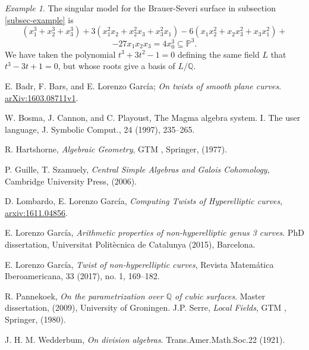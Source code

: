\documentclass[a4paper,10pt]{amsart}
\theoremstyle{plain}
\theoremstyle{definition}
\theoremstyle{remark}
\newtheorem{example}[theorem]{Example}
\numberwithin{equation}{section}
\begin{document}
\begin{example}The singular model for the Brauer-Severi surface in subsection \ref{subsec-example} is
	\small
	$$
	(x_1^3+x_2^3+x_3^3)+3(x_1^2x_2+x_2^2x_3+x_3^2x_1)-6(x_1x_2^2+x_2x_3^2+x_3x_1^2)+$$
	$$-27x_1x_2x_3=4x_{0}^3\subseteq\mathbb{P}^3.
	$$
	\normalsize
	We have taken the polynomial $t^3+3t^2-1=0$ defining the same field $L$ that $t^3-3t+1=0$, but whose roots give a basis of $L/\mathbb{Q}$.
\end{example}

\begin{thebibliography}{10}
	
	E. Badr, F. Bars, and E. Lorenzo Garc\'ia; \emph{On twists of smooth plane curves}. \href{https://arxiv.org/abs/1603.08711}{arXiv:1603.08711v1}.
	

	 W. Bosma, J. Cannon, and C. Playoust, The Magma algebra system. I. The user language, J. Symbolic Comput., 24 (1997), 235--265.
	

	 R. Hartshorne, \emph{Algebraic Geometry}, GTM , Springer, (1977).

	 P. Guille, T. Szamuely, \emph{Central Simple Algebras and
		Galois Cohomology}, Cambridge University Press, (2006).
	
	
	 D. Lombardo, E. Lorenzo Garc\'ia, \emph{Computing Twists of Hyperelliptic curves}, \href{https://arxiv.org/abs/1611.04856}{arxiv:1611.04856}.
	
	 E. Lorenzo Garc\'ia, \emph{Arithmetic properties of non-hyperelliptic genus 3
		curves}. PhD dissertation, Universitat Polit\`ecnica de Catalunya
	(2015), Barcelona.
	
	 E. Lorenzo Garc\'ia, \emph{Twist of non-hyperelliptic curves},
	Revista Matem\'atica Iberoamericana, 33 (2017), no. 1, 169--182. 

	 R. Pannekoek, \emph{On the parametrization over $\mathbb{Q}$
		of cubic surfaces}. Master dissertation, (2009), University of
	Groningen.
	 J.P. Serre, \emph{Local Fields}, GTM , Springer, (1980).
	 
	 J. H. M. Wedderbum, \emph{On division algebras}. Trans.Amer.Math.Soc.22 (1921).
	
\end{thebibliography}
\end{document}
